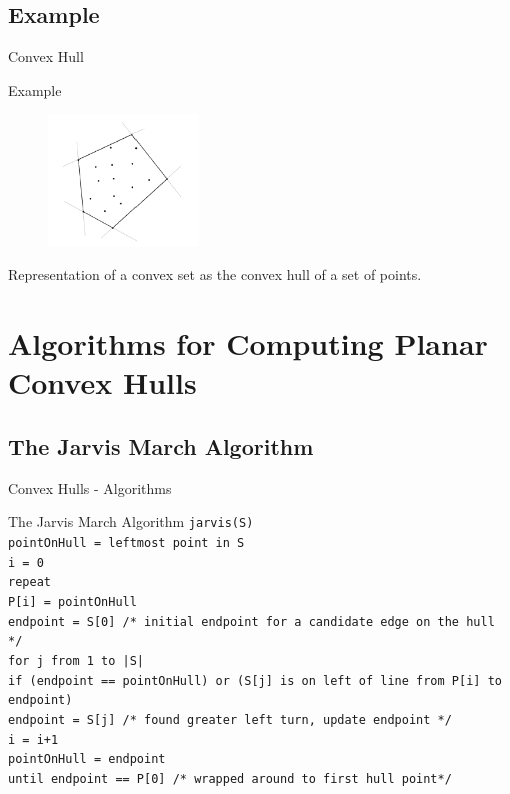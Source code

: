 \documentclass{beamer}
\begin{document}
\subsection{Example}
\begin{frame}{Convex Hull}
\begin{exampleblock}{Example}
\begin{figure}[h]
\includegraphics[width=4cm]{picture5}
\end{figure}
Representation of a convex set as the convex hull of a set of points.
\end{exampleblock}
\end{frame}

\section{Algorithms for Computing Planar Convex Hulls}
\subsection{The Jarvis March Algorithm}
\begin{frame}{Convex Hulls - Algorithms}
\begin{block}{The Jarvis March Algorithm}
\fontsize{6pt}{7.2}\selectfont
\texttt{jarvis(S) \\
   \hspace*{0.5cm}pointOnHull = leftmost point in S \\
   \hspace*{0.5cm}i = 0 \\
   \hspace*{0.5cm}repeat \\
      \hspace*{1cm}P[i] = pointOnHull \\
      \hspace*{1cm}endpoint = S[0]         /* initial endpoint for a candidate edge on the hull */ \\
 \hspace*{1cm}for j from 1 to |S| \\
         \hspace*{1.5cm}if (endpoint == pointOnHull) or (S[j] is on left of line from P[i] to endpoint) \\
            \hspace*{2cm}endpoint = S[j]   /* found greater left turn, update endpoint */ \\
      \hspace*{1cm}i = i+1 \\
      \hspace*{1cm}pointOnHull = endpoint \\
   \hspace*{0.5cm}until endpoint == P[0]      /* wrapped around to first hull point*/ }
\end{block}
\end{frame}
\end{document}
